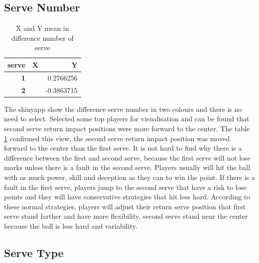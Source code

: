\documentclass[11pt,a4paper,]{article}
\begin{document}
\hypertarget{serve-number}{%
\subsection{Serve Number}\label{serve-number}}

\begin{table}

\caption{\label{tab:sermean}X and Y mean in difference number of serve}
\centering
\begin{tabular}[t]{>{}r||>{\raggedleft\arraybackslash}p{10em}|r}
\hline
serve & X & Y\\
\hline
\textbf{1} & \cellcolor{white}{-13.35178} & 0.2766256\\
\hline
\textbf{2} & \cellcolor{white}{-12.51856} & -0.3863715\\
\hline
\end{tabular}
\end{table}

The shinyapp show the difference serve number in two colours and there is no need to select. Selected some top players for visualisation and can be found that second serve return impact positions were more forward to the center. The table \ref{tab:sermean} confirmed this view, the second serve return impact position was moved forward to the center than the first serve. It is not hard to find why there is a difference between the first and second serve, because the first serve will not lose marks unless there is a fault in the second serve. Players usually will hit the ball with as much power, skill and deception as they can to win the point. If there is a fault in the first serve, players jump to the second serve that have a risk to lose points and they will have conservative strategies that hit less hard. According to these normal strategies, players will adjust their return serve position that first serve stand farther and have more flexibility, second serve stand near the center because the ball is less hard and variability.

\hypertarget{serve-type}{%
\subsection{Serve Type}\label{serve-type}}
\end{document}

